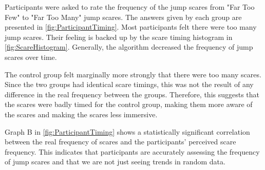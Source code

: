 \documentclass[12pt,a4paper]{article}\usepackage[]{graphicx}\usepackage[]{color}
\begin{document}
Participants were asked to rate the frequency of the jump scares from "Far Too Few" to "Far Too Many" jump scares.
The answers given by each group are presented in \vref{fig:ParticipantTiming}.
Most participants felt there were too many jump scares.
Their feeling is backed up by the scare timing histogram in \vref{fig:ScareHistogram}.
Generally, the algorithm decreased the frequency of jump scares over time.

The control group felt marginally more strongly that there were too many scares.
Since the two groups had identical scare timings, this was not the result of any difference in the real frequency between the groups.
Therefore, this suggests that the scares were badly timed for the control group, making them more aware of the scares and making the scares less immersive.

Graph B in \cref{fig:ParticipantTiming} shows a statistically significant correlation between the real frequency of scares and the participants' perceived scare frequency.
This indicates that participants are accurately assessing the frequency of jump scares and that we are not just seeing trends in random data.
\end{document}
